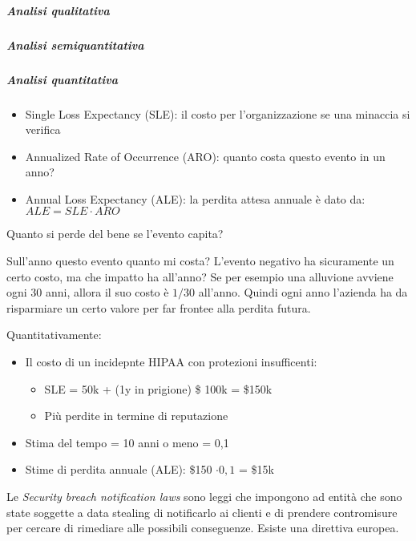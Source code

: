 \subparagraph*{Analisi qualitativa}



\subparagraph*{Analisi semiquantitativa}


\subparagraph*{Analisi quantitativa}

\begin{itemize}
\item Single Loss Expectancy (SLE): il costo per l'organizzazione se una
minaccia si verifica
\item Annualized Rate of Occurrence (ARO): quanto costa questo evento in un
anno?
\item Annual Loss Expectancy (ALE): la perdita attesa annuale è dato da: $ALE =
SLE \cdot ARO$
\end{itemize}


Quanto si perde del bene se l'evento capita?

Sull'anno questo evento quanto mi costa? L'evento negativo ha sicuramente un
certo costo, ma che impatto ha all'anno? Se per esempio una alluvione avviene
ogni 30 anni, allora il suo costo è $1/30$ all'anno. Quindi ogni anno l'azienda
ha da risparmiare un certo valore per far frontee alla perdita futura.



Quantitativamente:
\begin{itemize}
\item Il costo di un incidepnte HIPAA con protezioni insufficenti:
\begin{itemize}
 \item SLE = 50k + (1y in prigione) \$ 100k = \$150k
 \item Più perdite in termine di reputazione
\end{itemize}
\item Stima del tempo = 10 anni o meno = 0,1
\item Stime di perdita annuale (ALE): \$150 $\cdot 0,1$ = \$15k
\end{itemize}



Le \textit{Security breach notification laws} sono leggi che impongono ad entità
che sono state soggette a data stealing di notificarlo ai clienti e di prendere
contromisure per cercare di rimediare alle possibili conseguenze. Esiste una
direttiva europea.


